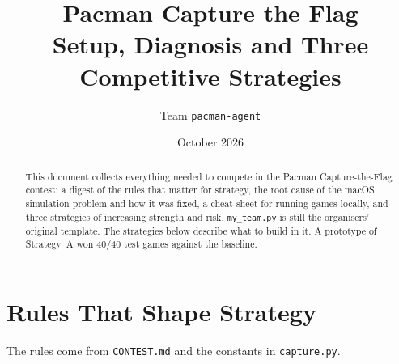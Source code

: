 \documentclass[11pt,a4paper]{article}
\title{\textbf{Pacman Capture the Flag}\\[4pt]\large Setup, Diagnosis and Three Competitive Strategies}
\author{Team \texttt{pacman-agent}}
\date{October 2026}
\begin{document}
\maketitle

\begin{abstract}
\noindent This document collects everything needed to compete in the Pacman Capture-the-Flag contest:
a digest of the rules that matter for strategy, the root cause of the macOS simulation problem and
how it was fixed, a cheat-sheet for running games locally, and three strategies of increasing strength
and risk. \texttt{my\_team.py} is still the organisers' original template. The strategies below describe what to build in it.
A prototype of Strategy~A won 40/40 test games against the baseline.
\end{abstract}

\tableofcontents
\newpage

\section{Rules That Shape Strategy}

The rules come from \texttt{CONTEST.md} and the constants in \texttt{capture.py}.
\end{document}
